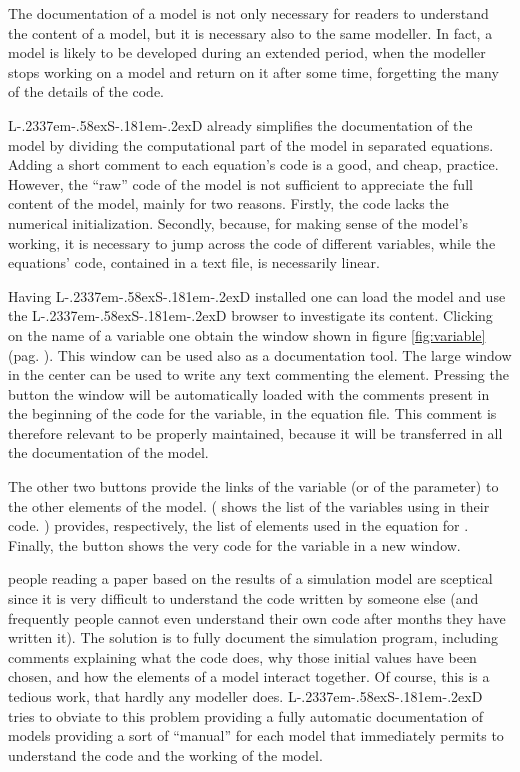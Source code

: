 \documentclass [11pt,a4paper] {book}
\def\LsD{{L\kern-.2337em\lower-.58ex\hbox{S}\kern-.181em\lower-.2ex\hbox{D}}\xspace}
\begin{document}
The documentation of a model is not only necessary for readers to understand the content of a model, but it is necessary also to the same modeller. In fact, a model is likely to be developed during an extended period, when the modeller stops working on a model and return on it after some time, forgetting the many of the details of the code.

\LsD already simplifies the documentation of the model by dividing the computational part of the model in separated equations. Adding a short comment to each equation's code is a good, and cheap, practice. However, the ``raw'' code of the model is not sufficient to appreciate the full content of the model, mainly for two reasons. Firstly, the code lacks the numerical initialization. Secondly, because, for making sense of the model's working, it is necessary to jump across the code of different variables, while the equations' code, contained in a text file, is necessarily linear.

Having \LsD installed one can load the model and use the \LsD browser to investigate its content. Clicking on the name of a variable one obtain the window shown in figure \ref{fig:variable} (pag. \pageref{fig:variable}). This window can be used also as a documentation tool. The large window in the center can be used to write any text commenting the element. Pressing the button  the window will be automatically loaded with the comments present in the beginning of the code for the variable, in the equation file. This comment is therefore relevant to be properly maintained, because it will be transferred in all the documentation of the model.

The other two buttons provide the links of the variable (or of the parameter) to the other elements of the model. ( shows the list of the variables using  in their code. ) provides, respectively, the list of elements used in the equation for . Finally, the button  shows the very code for the variable in a new window.





people reading
a paper based on the results of a simulation model are sceptical since it is very
difficult to understand the code written by someone else (and frequently people cannot
even understand their own code after months they have written it). The solution is to
fully document the simulation program, including comments explaining what the code does,
why those initial values have been chosen, and how the elements of a model interact
together. Of course, this is a tedious work, that hardly any modeller does. \LsD tries to
obviate to this problem providing a fully automatic documentation of models providing a
sort of ``manual'' for each model that immediately permits to understand the code and the
working of the model.
\end{document}
